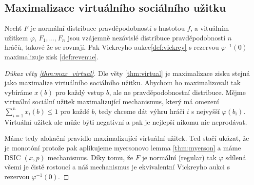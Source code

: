 \subsection{Maximalizace virtuálního sociálního užitku}
\begin{theorem}\label{thm:max_virtual}
  Nechť $F$ je normální distribuce pravděpodobností s hustotou $f$, a vituálním užitkem $\varphi$, $F_1, \dots,F_n$ jsou vzájemně nezávislé distribuce pravděpodobností $n$ hráčů, takové že se rovnají. 
  Pak Vickreyho aukce\ref{def:vickrey} s rezervou $\varphi^{-1} (0)$ maximalizuje zisk \ref{def:revenue}. 
\end{theorem}
\begin{proof}[Důkaz věty \ref{thm:max_virtual}]
    Dle věty \ref{thm:virtual} je maximalizace zisku stejná jako maximalize virtuálního sociálního užitku.
    Abychom ho maximalizovali tak vybíráme $x(b)$ pro každý vstup $b$, ale ne pravděpodobnostní distribuce. 
    Mějme virtuální sociální užitek maximalizující mechanismus, který má omezení $\sum^n_{i=1}x_i(b) \leq 1$ pro každé $b$, tedy chceme dát výhru hráči $i$ s nejvyšší $\varphi(b_i)$. 
    Virtuální užitek ale může býti negativní a pak je nejlepší nikomu nic neprodávat. 

    Máme tedy alokační pravidlo maximalizující virtuální užitek. 
    Ted stačí ukázat, že je monotóní protože pak aplikujeme myersonovo lemma \ref{thm:myerson} a máme DSIC $(x,p)$ mechanismus. 
    Díky tomu, že $F$ je normální (regular) tak $\varphi$ sdílená všemi je čistě rostoucí a náš mechanismus je ekvivalentní Vickreyho aukci s rezervou $\varphi^{-1}(0)$. 
\end{proof}
